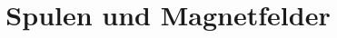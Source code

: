 

\subject{Versuch 308}
\title{Spulen und Magnetfelder}


    \maketitle
    \thispagestyle{empty}
    \tableofcontents
    \newpage
    
    
    \newpage
    
    \newpage
    
    
    
    \printbibliography{}

